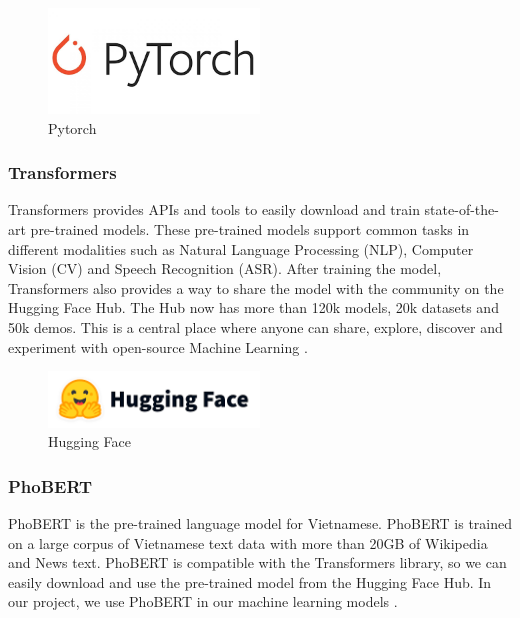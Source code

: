 \begin{figure}[ht]
    \centering
    \includegraphics[width=0.5\textwidth]{../Images/8.Technology_Stack/pytorch_logo.png}
    \caption{Pytorch}
    \label{fig:pytorch}
\end{figure}

\subsubsection{Transformers}
Transformers provides APIs and tools to easily download and train state-of-the-art pre-trained models. These pre-trained models support common tasks in different modalities such as Natural Language Processing (NLP), Computer Vision (CV) and Speech Recognition (ASR). After training the model, Transformers also provides a way to share the model with the community on the Hugging Face Hub. The Hub now has more than 120k models, 20k datasets and 50k demos. This is a central place where anyone can share, explore, discover and experiment with open-source Machine Learning \cite{huggingface}.

\begin{figure}[ht]
    \centering
    \includegraphics[width=0.5\textwidth]{../Images/8.Technology_Stack/huggingface_logo.png}
    \caption{Hugging Face}
    \label{fig:huggingface}
\end{figure}

\subsubsection{PhoBERT}
PhoBERT is the pre-trained language model for Vietnamese. PhoBERT is trained on a large corpus of Vietnamese text data with more than 20GB of Wikipedia and News text. PhoBERT is compatible with the Transformers library, so we can easily download and use the pre-trained model from the Hugging Face Hub. In our project, we use PhoBERT in our machine learning models \cite{phobert}.

